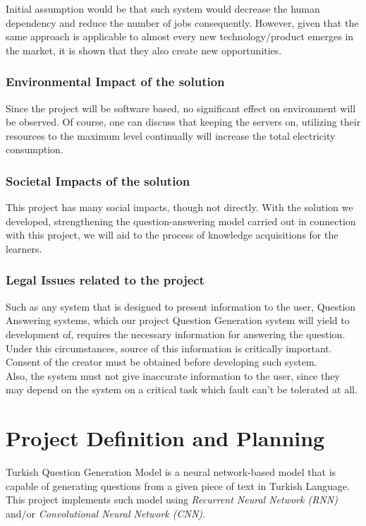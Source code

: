 \documentclass{mefsdp}
\begin{document}
	Initial assumption would be that such system would decrease the human dependency and reduce the number of jobs consequently. However, given that the same approach is applicable to almost every new technology/product emerges in the market, it is shown that they also create new opportunities. 
	
	
	\subsubsection{Environmental Impact of the solution}
	Since the project will be software based, no significant effect on environment will be observed. Of course, one can discuss that keeping the servers on, utilizing their resources to the maximum level continually will increase the total electricity consumption. 
	
	\subsubsection{Societal Impacts of the solution}
	This project has many social impacts, though not directly. With the solution we developed, strengthening the question-answering model carried out in connection with this project, we will aid to the process of knowledge acquisitions for the learners.
	
	
	\subsubsection{Legal Issues related to the project}
	Such as any system that is designed to present information to the user, Question Answering systems, which our project Question Generation system will yield to development of, requires the necessary information for answering the question. Under this circumstances, source of this information is critically important. Consent of the creator must be obtained before developing such system. \\
	
	Also, the system must not give inaccurate information to the user, since they may depend on the system on a critical task which fault can’t be tolerated at all.
	
	\section{Project Definition and Planning}
	Turkish Question Generation Model is a neural network-based model that is capable of generating questions from a given piece of text in Turkish Language. This project implements such model using \textit{Recurrent Neural Network (RNN)} and/or \textit{Convolutional Neural Network (CNN)}.
	
\end{document}
